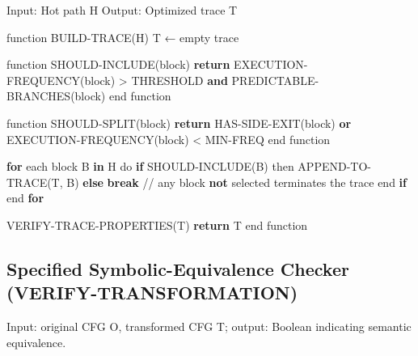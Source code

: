 \documentclass[
  11pt,
]{article}
\newenvironment{Shaded}{}{}
\newcommand{\BuiltInTok}[1]{\textcolor[rgb]{0.00,0.50,0.00}{#1}}
\newcommand{\ControlFlowTok}[1]{\textcolor[rgb]{0.00,0.44,0.13}{\textbf{#1}}}
\newcommand{\KeywordTok}[1]{\textcolor[rgb]{0.00,0.44,0.13}{\textbf{#1}}}
\newcommand{\NormalTok}[1]{#1}
\newcommand{\OperatorTok}[1]{\textcolor[rgb]{0.40,0.40,0.40}{#1}}
\begin{document}
\begin{Shaded}
\begin{Highlighting}[]
\NormalTok{Input: Hot path H}
\NormalTok{Output: Optimized trace T}

\NormalTok{function BUILD}\OperatorTok{{-}}\NormalTok{TRACE(H)}
\NormalTok{    T ← empty trace}
    
\NormalTok{    function SHOULD}\OperatorTok{{-}}\NormalTok{INCLUDE(block)}
        \ControlFlowTok{return}\NormalTok{ EXECUTION}\OperatorTok{{-}}\NormalTok{FREQUENCY(block) }\OperatorTok{\textgreater{}}\NormalTok{ THRESHOLD }\KeywordTok{and}
\NormalTok{               PREDICTABLE}\OperatorTok{{-}}\NormalTok{BRANCHES(block)}
\NormalTok{    end function}
    
\NormalTok{    function SHOULD}\OperatorTok{{-}}\NormalTok{SPLIT(block)}
        \ControlFlowTok{return}\NormalTok{ HAS}\OperatorTok{{-}}\NormalTok{SIDE}\OperatorTok{{-}}\NormalTok{EXIT(block) }\KeywordTok{or}
\NormalTok{               EXECUTION}\OperatorTok{{-}}\NormalTok{FREQUENCY(block) }\OperatorTok{\textless{}}\NormalTok{ MIN}\OperatorTok{{-}}\NormalTok{FREQ}
\NormalTok{    end function}
    
    \ControlFlowTok{for}\NormalTok{ each block B }\KeywordTok{in}\NormalTok{ H do}
        \ControlFlowTok{if}\NormalTok{ SHOULD}\OperatorTok{{-}}\NormalTok{INCLUDE(B) then}
\NormalTok{            APPEND}\OperatorTok{{-}}\NormalTok{TO}\OperatorTok{{-}}\NormalTok{TRACE(T, B)}
        \ControlFlowTok{else}
            \ControlFlowTok{break}   \OperatorTok{//} \BuiltInTok{any}\NormalTok{ block }\KeywordTok{not}\NormalTok{ selected terminates the trace}
\NormalTok{        end }\ControlFlowTok{if}
\NormalTok{    end }\ControlFlowTok{for}
    
\NormalTok{    VERIFY}\OperatorTok{{-}}\NormalTok{TRACE}\OperatorTok{{-}}\NormalTok{PROPERTIES(T)}
    \ControlFlowTok{return}\NormalTok{ T}
\NormalTok{end function}
\end{Highlighting}
\end{Shaded}

\subsection{Specified Symbolic-Equivalence Checker
(VERIFY-TRANSFORMATION)}\label{specified-symbolic-equivalence-checker-verify-transformation}

Input: original CFG O, transformed CFG T; output: Boolean indicating
semantic equivalence.
\end{document}
